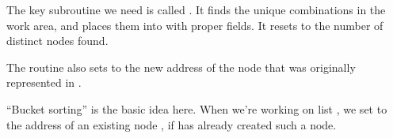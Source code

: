 The key subroutine we need is called . It
finds the
unique combinations  in the
work area, and places them into  with proper 
fields.
It resets  to the number of distinct nodes found.

The  routine also sets  to the new address of
the
node that was originally represented in .

``Bucket sorting'' is the basic idea here.
When we're working on list , we set  to
the address of an existing node , if  has
already created such a node.

